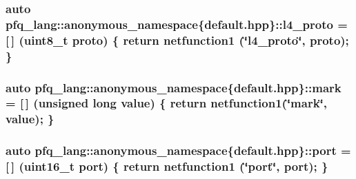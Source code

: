 \hypertarget{namespacepfq__lang_1_1anonymous__namespace_02default_8hpp_03_a75da77904f1cff4cc42fc3a081f80670}{
\subsubsection[{l4\+\_\+proto}]{\setlength{\rightskip}{0pt plus 5cm}auto pfq\+\_\+lang\+::anonymous\+\_\+namespace\{default.\+hpp\}\+::l4\+\_\+proto = \mbox{[}$\,$\mbox{]} (uint8\+\_\+t proto) \{ return {\bf netfunction1} (\char`\"{}l4\+\_\+proto\char`\"{}, proto); \}}}\label{namespacepfq__lang_1_1anonymous__namespace_02default_8hpp_03_a75da77904f1cff4cc42fc3a081f80670}
\hypertarget{namespacepfq__lang_1_1anonymous__namespace_02default_8hpp_03_ad6142fe3a0fc859f25ea16956f52a5f0}{
\subsubsection[{mark}]{\setlength{\rightskip}{0pt plus 5cm}auto pfq\+\_\+lang\+::anonymous\+\_\+namespace\{default.\+hpp\}\+::mark = \mbox{[}$\,$\mbox{]} (unsigned long value) \{ return {\bf netfunction1}(\char`\"{}mark\char`\"{}, value); \}}}\label{namespacepfq__lang_1_1anonymous__namespace_02default_8hpp_03_ad6142fe3a0fc859f25ea16956f52a5f0}
\hypertarget{namespacepfq__lang_1_1anonymous__namespace_02default_8hpp_03_a1b370b44e5eedc364f3bb306d5042738}{
\subsubsection[{port}]{\setlength{\rightskip}{0pt plus 5cm}auto pfq\+\_\+lang\+::anonymous\+\_\+namespace\{default.\+hpp\}\+::port = \mbox{[}$\,$\mbox{]} (uint16\+\_\+t port) \{ return {\bf netfunction1} (\char`\"{}port\char`\"{}, port); \}}}\label{namespacepfq__lang_1_1anonymous__namespace_02default_8hpp_03_a1b370b44e5eedc364f3bb306d5042738}

